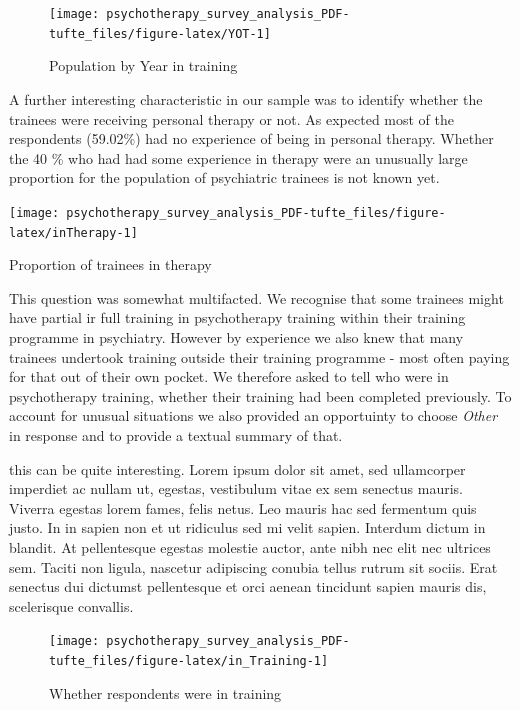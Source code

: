 \documentclass[]{tufte-handout}
\begin{document}
\begin{figure}
\texttt{[image: psychotherapy\_survey\_analysis\_PDF-tufte\_files/figure-latex/YOT-1]} \caption[Population by Year in training]{Population by Year in training}\label{fig:YOT}
\end{figure}

 A further interesting
characteristic in our sample was to identify whether the trainees were
receiving personal therapy or not. As expected most of the respondents
(59.02\%) had no experience of being in personal therapy. Whether the 40
\% who had had some experience in therapy were an unusually large
proportion for the population of psychiatric trainees is not known yet.

\begin{marginfigure}
\texttt{[image: psychotherapy\_survey\_analysis\_PDF-tufte\_files/figure-latex/inTherapy-1]} \caption[Proportion of trainees in therapy]{Proportion of trainees in therapy}\label{fig:inTherapy}
\end{marginfigure}

 This question
was somewhat multifacted. We recognise that some trainees might have
partial ir full training in psychotherapy training within their training
programme in psychiatry. However by experience we also knew that many
trainees undertook training outside their training programme - most
often paying for that out of their own pocket. We therefore asked to
tell who were in psychotherapy training, whether their training had been
completed previously. To account for unusual situations we also provided
an opportuinty to choose \emph{Other} in response and to provide a
textual summary of that.

 this can be quite interesting. Lorem
ipsum dolor sit amet, sed ullamcorper imperdiet ac nullam ut, egestas,
vestibulum vitae ex sem senectus mauris. Viverra egestas lorem fames,
felis netus. Leo mauris hac sed fermentum quis justo. In in sapien non
et ut ridiculus sed mi velit sapien. Interdum dictum in blandit. At
pellentesque egestas molestie auctor, ante nibh nec elit nec ultrices
sem. Taciti non ligula, nascetur adipiscing conubia tellus rutrum sit
sociis. Erat senectus dui dictumst pellentesque et orci aenean tincidunt
sapien mauris dis, scelerisque convallis.

\begin{figure}
\texttt{[image: psychotherapy\_survey\_analysis\_PDF-tufte\_files/figure-latex/in\_Training-1]} \caption[Whether respondents were in training]{Whether respondents were in training}\label{fig:in_Training}
\end{figure}
\end{document}
